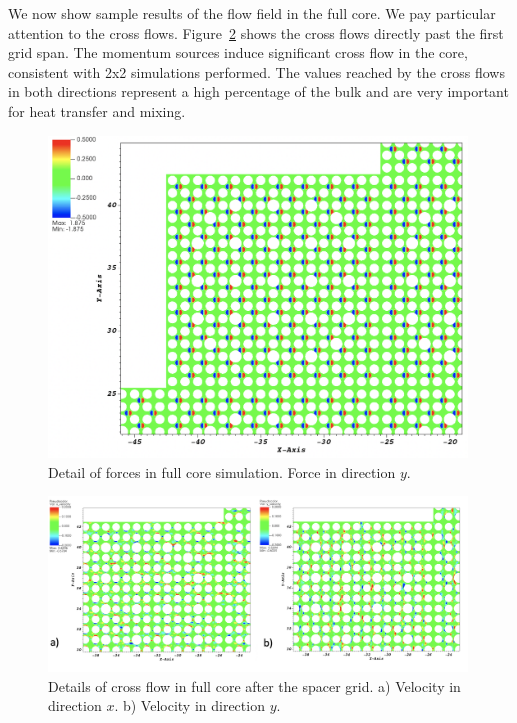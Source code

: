 We now show sample results of the flow field in the full core. We pay particular attention to the cross flows. Figure~\ref{fig:msm1} shows the cross flows directly past the first grid span. The momentum sources induce significant cross flow in the core, consistent with 2x2 simulations performed. The values reached by the cross flows in both directions represent a high percentage of the bulk and are very important for heat transfer and mixing.

\begin{figure}[!ht]
\centering
\includegraphics[width=0.99\textwidth]{./figures/1span_msm.png}
\caption{Detail of forces in full core simulation. Force in direction $y$. }
\label{fig:msm}
\end{figure}

\begin{figure}[!ht]
\centering
\includegraphics[width=0.99\textwidth]{./figures/1span_msm_v1.png}
\caption{Details of cross flow in full core after the spacer grid. a) Velocity in direction $x$. b) Velocity in direction $y$. }
\label{fig:msm1}
\end{figure}


